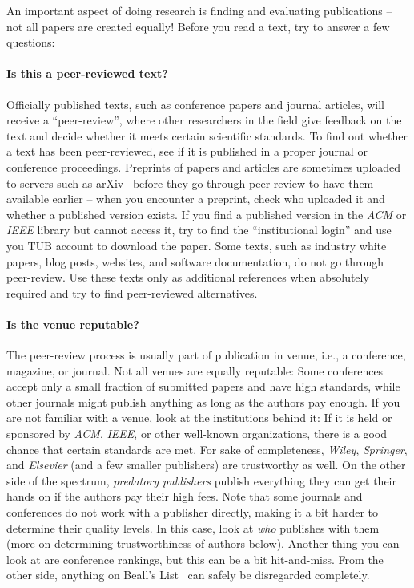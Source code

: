 \documentclass[a4paper]{article}
\begin{document}
An important aspect of doing research is finding and evaluating publications -- not all papers are created equally!
Before you read a text, try to answer a few questions:

\paragraph{Is this a peer-reviewed text?}
Officially published texts, such as conference papers and journal articles, will receive a ``peer-review'', where other researchers in the field give feedback on the text and decide whether it meets certain scientific standards.
To find out whether a text has been peer-reviewed, see if it is published in a proper journal or conference proceedings.
Preprints of papers and articles are sometimes uploaded to servers such as arXiv~\cite{arxiv} before they go through peer-review to have them available earlier -- when you encounter a preprint, check who uploaded it and whether a published version exists.
If you find a published version in the \emph{ACM} or \emph{IEEE} library but cannot access it, try to find the ``institutional login'' and use you TUB account to download the paper.
Some texts, such as industry white papers, blog posts, websites, and software documentation, do not go through peer-review.
Use these texts only as additional references when absolutely required and try to find peer-reviewed alternatives.

\paragraph{Is the venue reputable?}
The peer-review process is usually part of publication in venue, i.e., a conference, magazine, or journal.
Not all venues are equally reputable:
Some conferences accept only a small fraction of submitted papers and have high standards, while other journals might publish anything as long as the authors pay enough.
If you are not familiar with a venue, look at the institutions behind it:
If it is held or sponsored by \emph{ACM}, \emph{IEEE}, or other well-known organizations, there is a good chance that certain standards are met.
For sake of completeness, \emph{Wiley}, \emph{Springer}, and \emph{Elsevier} (and a few smaller publishers) are trustworthy as well.
On the other side of the spectrum, \emph{predatory publishers} publish everything they can get their hands on if the authors pay their high fees.
Note that some journals and conferences do not work with a publisher directly, making it a bit harder to determine their quality levels.
In this case, look at \emph{who} publishes with them (more on determining trustworthiness of authors below).
Another thing you can look at are conference rankings, but this can be a bit hit-and-miss.
From the other side, anything on Beall's List~\cite{beallslist} can safely be disregarded completely.
\end{document}
